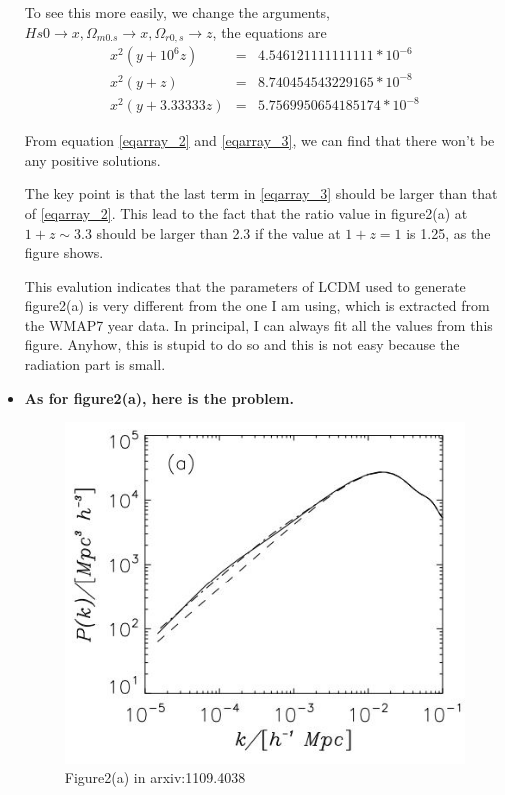 \documentclass{article}
\begin{document}
\begin{itemize}
To see this more easily, we change the arguments, $Hs0\rightarrow x, \Omega_{m0.s}\rightarrow x, \Omega_{r0,s}\rightarrow z$, the equations are
\begin{eqnarray}
x^2 \left(y+10^6 z\right)&=&4.546121111111111*10^{-6}\\
x^2 (y+z)&=& 8.740454543229165* 10^{-8}\label{eqarray_2}\\
x^2 (y+3.33333 z)&=& 5.7569950654185174*10^{-8} \label{eqarray_3}
\end{eqnarray}

From equation \ref{eqarray_2} and \ref{eqarray_3}, we can find that there won't be any positive solutions.

The key point is that the last term in \ref{eqarray_3} should be larger than that of \ref{eqarray_2}. This lead to the fact that the ratio value in figure2(a) at $1+z\sim 3.3$ should be larger than 2.3 if the value at $1+z=1$ is 1.25, as the figure shows.

This evalution indicates that the parameters of LCDM used to generate figure2(a) is very different from the one I am using, which is extracted from the WMAP7 year data.
In principal, I can always fit all the values from this figure. Anyhow, this is stupid to do so and this is not easy because the radiation part is small.






\item

{\bf As for figure2(a), here is the problem.}

\begin{figure}[!htpb]
\centering
\includegraphics[width=350pt]{figure2_a.jpg}
\caption{Figure2(a) in arxiv:1109.4038}\label{fig:figure2_a}
\end{figure}


\end{itemize}
\end{document}
